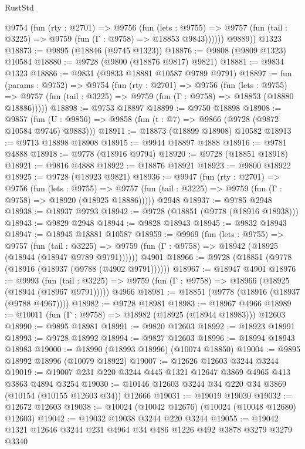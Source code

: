 \begin{lexlean}{RustStd}
\begin{coremodule}
{\begin{coremodule}
{{{{{{{{{{{{{{{{{{{{{{{{{{          @9754
            (fun (rty : @2701) =>
            @9756
              (fun (lets : @9755) =>
              @9757 (fun (tail : @3225) => @9759 (fun (Γ : @9758) => @18853 @9843))))))
        @9889))
    @1323
@18873 := @9895 (@18846 (@9745 @1323))
@18876 := @9808 (@9809 @1323) @10584
@18880 := @9728 (@9800 (@18876 @9817) @9821)
@18881 := @9834 @1323
@18886 := @9831 (@9833 @18881 @10587 @9789 @9791)
@18897 := fun (params : @9752) =>
  @9754
    (fun (rty : @2701) =>
    @9756
      (fun (lets : @9755) =>
      @9757 (fun (tail : @3225) => @9759 (fun (Γ : @9758) => @18853 (@18880 @18886)))))
@18898 := @9753 @18897
@18899 := @9750 @18898
@18908 := @9857
    (fun (U : @9856) => @9858 (fun (t : @7) => @9866 (@9728 (@9872 @10584 @9746) @9883)))
@18911 := @18873 (@18899 @18908) @10582
@18913 := @9713 @18898 @18908
@18915 := @9944 @18897 @4888
@18916 := @9781 @4888
@18918 := @9778 (@18916 @9794)
@18920 := @9728 (@18851 @18918)
@18921 := @9816 @4888
@18922 := @18876 @18921
@18923 := @9800 @18922
@18925 := @9728 (@18923 @9821)
@18936 := @9947
    (fun (rty : @2701) =>
    @9756
      (fun (lets : @9755) =>
      @9757 (fun (tail : @3225) => @9759 (fun (Γ : @9758) => @18920 (@18925 @18886)))))
    @2948
@18937 := @9785 @2948
@18938 := @18937 @9793
@18942 := @9728 (@18851 (@9778 (@18916 @18938)))
@18943 := @9829 @2948
@18944 := @9828 @18943
@18945 := @9832 @18943
@18947 := @18945 @18881 @10587
@18959 := @9969
    (fun (lets : @9755) =>
    @9757
      (fun (tail : @3225) =>
      @9759 (fun (Γ : @9758) => @18942 (@18925 (@18944 (@18947 @9789 @9791))))))
    @4901
@18966 := @9728 (@18851 (@9778 (@18916 (@18937 (@9788 (@4902 @9791))))))
@18967 := @18947 @4901
@18976 := @9993
    (fun (tail : @3225) => @9759 (fun (Γ : @9758) => @18966 (@18925 (@18944 (@18967 @9791)))))
    @4966
@18981 := @18851 (@9778 (@18916 (@18937 (@9788 @4967))))
@18982 := @9728 @18981
@18983 := @18967 @4966
@18989 := @10011 (fun (Γ : @9758) => @18982 (@18925 (@18944 @18983))) @12603
@18990 := @9895 @18981
@18991 := @9820 @12603
@18992 := @18923 @18991
@18993 := @9728 @18992
@18994 := @9827 @12603
@18996 := @18994 @18943 @18983
@19000 := @18990 (@18993 @18996) (@10074 @18850)
@19004 := @9895 @18992 @18996 (@10079 @18922)
@19007 := @12626 @12603 @3244 @3244
@19019 := @19007 @231 @220 @3244 @445 @1321 @12647 @3869 @4965 @413 @3863 @4894 @3254
@19030 := @10146 @12603 @3244 @34 @220 @34 @3869 (@10154 (@10155 @12603 @34)) @12666
@19031 := @19019 @19030
@19032 := @12672 @12603
@19038 := @10024 (@10042 @12676) (@10024 (@10048 @12680) @12603)
@19042 := @19032 @19038 @3244 @220 @3244
@19055 := @19042 @1321 @12646 @3244 @231 @4964 @34 @486 @1226 @492 @3878 @3279 @3279 @3340
}}}}}}}}}}}}}}}}}}}}}}}}}}
\end{coremodule}}
\end{coremodule}
\end{lexlean}
